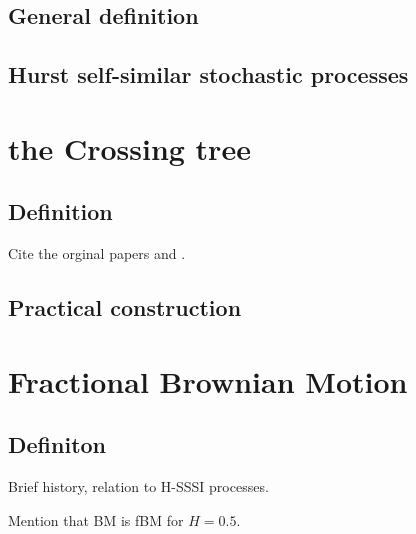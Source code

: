 \documentclass[a4paper]{report}
\begin{document}
\subsection{General definition} %
\label{sub:general_definition}


\subsection{Hurst self-similar stochastic processes} %
\label{sub:hurst_self_similar_stochastic_processes}



\section{the Crossing tree} %
\label{sec:the_crossing_tree}

\subsection{Definition} %
\label{sub:definition}
Cite the orginal papers \cite{jones2004} and \cite{jonesshen2005}.


\subsection{Practical construction} %
\label{sub:practical_construction}



\section{Fractional Brownian Motion} %
\label{sec:fractional_brownian_motion}

\subsection{Definiton} %
\label{sub:definiton}
Brief history, relation to H-SSSI processes.

Mention that BM is fBM for $H=0.5$.
\end{document}
